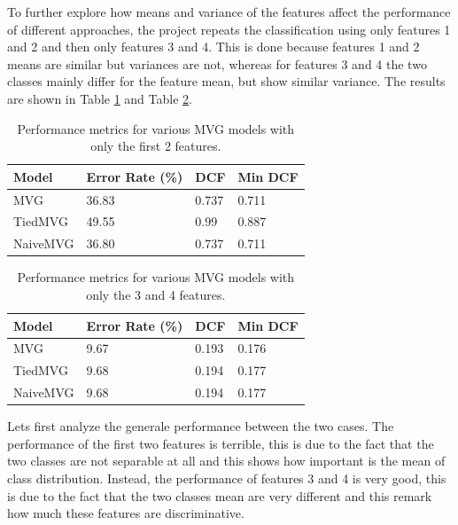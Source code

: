 \documentclass{article}
\begin{document}
To further explore how means and variance of the features affect the performance of different approaches, the project repeats the classification using only features 1 and 2 and then only features 3 and 4. This is done because features 1 and 2 means are similar but variances are not, whereas for features 3 and 4 the two classes mainly differ for the feature mean, but show similar variance. The results are shown in Table \ref{tab:mvg_performance_12} and Table \ref{tab:mvg_performance_34}.

\begin{table}[ht!]
    \centering
    \begin{tabularx}{\textwidth}{lXXX}
        \toprule
        \textbf{Model} & \textbf{Error Rate (\%)} & \textbf{DCF} & \textbf{Min DCF} \\
        \midrule
        MVG      & 36.83 & 0.737 & 0.711 \\
        TiedMVG  & 49.55 & 0.99  & 0.887 \\
        NaiveMVG & 36.80 & 0.737 & 0.711 \\
        \bottomrule
    \end{tabularx}
    \caption{Performance metrics for various MVG models with only the first 2 features.}
    \label{tab:mvg_performance_12}
\end{table}

\begin{table}[ht!]
    \centering
    \begin{tabularx}{\textwidth}{lXXX}
        \toprule
        \textbf{Model} & \textbf{Error Rate (\%)} & \textbf{DCF} & \textbf{Min DCF} \\
        \midrule
        MVG      & 9.67 & 0.193 & 0.176 \\
        TiedMVG  & 9.68 & 0.194 & 0.177 \\
        NaiveMVG & 9.68 & 0.194 & 0.177 \\
        \bottomrule
    \end{tabularx}
    \caption{Performance metrics for various MVG models with only the 3 and 4 features.}
    \label{tab:mvg_performance_34}
\end{table}

Lets first analyze the generale performance between the two cases. The performance of the first two features is terrible, this is due to the fact that the two classes are not separable at all and this shows how important is the mean of class distribution. Instead, the performance of features 3 and 4 is very good, this is due to the fact that the two classes mean are very different and this remark how much these features are discriminative.
\end{document}
